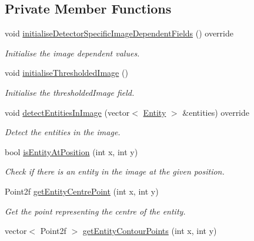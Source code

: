\subsection*{\-Private \-Member \-Functions}
\begin{DoxyCompactItemize}
\item 
void \hyperlink{classmultiscale_1_1analysis_1_1SimulationClusterDetector_a1f5127621294426b6406985dccb292cd}{initialise\-Detector\-Specific\-Image\-Dependent\-Fields} () override
\begin{DoxyCompactList}\small\item\em \-Initialise the image dependent values. \end{DoxyCompactList}\item 
void \hyperlink{classmultiscale_1_1analysis_1_1SimulationClusterDetector_ae36c793acaa548cc3ce74f72621d8bd7}{initialise\-Thresholded\-Image} ()
\begin{DoxyCompactList}\small\item\em \-Initialise the thresholded\-Image field. \end{DoxyCompactList}\item 
void \hyperlink{classmultiscale_1_1analysis_1_1SimulationClusterDetector_af3c2206724a69794e12f34fe7fe5082b}{detect\-Entities\-In\-Image} (vector$<$ \hyperlink{classmultiscale_1_1analysis_1_1Entity}{\-Entity} $>$ \&entities) override
\begin{DoxyCompactList}\small\item\em \-Detect the entities in the image. \end{DoxyCompactList}\item 
bool \hyperlink{classmultiscale_1_1analysis_1_1SimulationClusterDetector_a886031cb8d576c4cf380c1105eeee4d2}{is\-Entity\-At\-Position} (int x, int y)
\begin{DoxyCompactList}\small\item\em \-Check if there is an entity in the image at the given position. \end{DoxyCompactList}\item 
\-Point2f \hyperlink{classmultiscale_1_1analysis_1_1SimulationClusterDetector_a083c8ff51e483d86744961aca1ae3551}{get\-Entity\-Centre\-Point} (int x, int y)
\begin{DoxyCompactList}\small\item\em \-Get the point representing the centre of the entity. \end{DoxyCompactList}\item 
vector$<$ \-Point2f $>$ \hyperlink{classmultiscale_1_1analysis_1_1SimulationClusterDetector_ae51328d7fe0e477dea162c7e99da45c2}{get\-Entity\-Contour\-Points} (int x, int y)

\end{DoxyCompactItemize}

